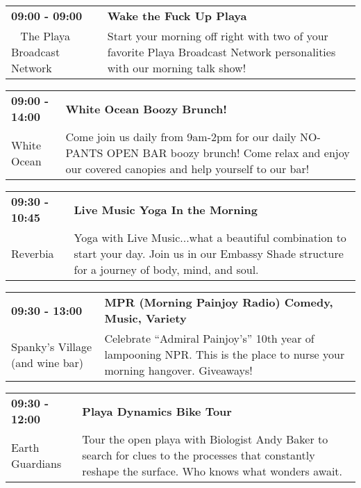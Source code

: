 \begin{tabular}{ p{1in} p{2.2in} }
    \textbf{09:00 - 09:00} & \textbf{Wake the Fuck Up Playa} \\
    ~ \newline The Playa Broadcast Network & Start your morning off right with two of your favorite Playa Broadcast Network personalities with our morning talk show! \\
    \hline 
\end{tabular}
    
\begin{tabular}{ p{1in} p{2.2in} }
    \textbf{09:00 - 14:00} & \textbf{White Ocean Boozy Brunch!} \\
    White Ocean \newline  & Come join us daily from 9am-2pm for our daily NO-PANTS OPEN BAR boozy brunch! Come relax and enjoy our covered canopies and help yourself to our bar! \\
    \hline 
\end{tabular}
    
\begin{tabular}{ p{1in} p{2.2in} }
    \textbf{09:30 - 10:45} & \textbf{Live Music Yoga In the Morning } \\
    Reverbia \newline  & Yoga with Live Music...what a beautiful combination to start your day. Join us in our Embassy Shade structure for a journey of body, mind, and soul. \\
    \hline 
\end{tabular}
    
\begin{tabular}{ p{1in} p{2.2in} }
    \textbf{09:30 - 13:00} & \textbf{MPR (Morning Painjoy Radio) Comedy, Music, Variety} \\
    Spanky's Village (and wine bar) \newline  & Celebrate ``Admiral Painjoy's'' 10th year of lampooning NPR.  This is the place to nurse your morning hangover.  Giveaways! \\
    \hline 
\end{tabular}
    
\begin{tabular}{ p{1in} p{2.2in} }
    \textbf{09:30 - 12:00} & \textbf{Playa Dynamics Bike Tour} \\
    Earth Guardians \newline  & Tour the open playa with Biologist Andy Baker to search for clues to the processes that constantly reshape the surface. Who knows what wonders await. \\
    \hline 
\end{tabular}
    
